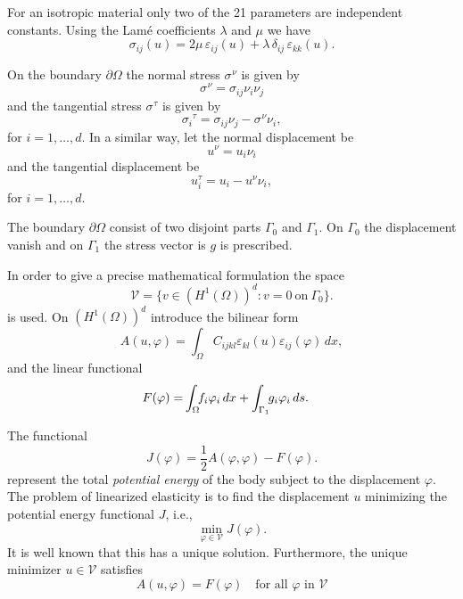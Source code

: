 \documentclass[12pt,a4paper]{article}
\numberwithin{equation}{section}
\numberwithin{table}{section}
\numberwithin{figure}{section}
\newcommand{\dOmega}{{\partial\Omega}}
\newcommand{\ton}{\ \text{on}\ }
\newcommand{\HenO}{H^1(\Omega)}
\newcommand{\V}{\ensuremath{\mathcal{V}}}
\newcommand{\intO}{\int_\Omega\!\!}
\newcommand{\intG}[1][0]{\int_{\Gamma_{#1}}\!\!}
\renewcommand{\epsilon}{\varepsilon}
\renewcommand{\phi}{\varphi}
\newcommand{\strain}[1][]{\ensuremath{\epsilon_{#1}}}
\newcommand{\epsij}{\strain[ij]}
\newcommand{\epskk}{\strain[kk]}
\newcommand{\epskl}{\strain[kl]}
\newcommand{\stress}[1][]{\ensuremath{\sigma_{#1}}}
\newcommand{\sigij}{\stress[ij]}
\newcommand{\dx}{{\,dx}}
\newcommand{\ds}{{\,ds}}
\begin{document}
For an isotropic material only two of the 21 parameters are independent constants.
Using the Lam\'{e} coefficients $\lambda$ and $\mu$ we have
\begin{equation}
  \label{eq:isotropStressStrain}
  \sigij(u) = 2\mu\, \epsij(u) 
  + \lambda\, \delta_{ij}\, \epskk(u).
\end{equation}

On the boundary $\dOmega$ the normal stress $\stress^\nu$ is given by
\[ \stress^\nu = \sigij \nu_i \nu_j \]
and the tangential stress $\stress^\tau$ is given by
\[ \stress[i]^\tau = \sigij \nu_j - \stress^\nu \nu_i, \]
for $i=1,\ldots,d$.  In a similar way, let the normal displacement be
\[ u^\nu = u_i \nu_i \]
and the tangential displacement be
\[ u^\tau_i = u_i - u^\nu \nu_i, \]
for $i=1,\ldots,d$.

The boundary $\dOmega$ consist of two disjoint parts $\Gamma_0$ and $\Gamma_1$.  On $\Gamma_0$ the displacement vanish and on $\Gamma_1$ the stress vector is $g$ is prescribed.

In order to give a precise mathematical formulation the space
\begin{equation}
\V = \{ v\in (\HenO)^d \colon v = 0 \ton\Gamma_0\}.
\end{equation}
is used.  On $(\HenO)^d$ introduce the bilinear form
\begin{equation}
\label{eq:Aelasticity}
A(u,\phi) = \intO C_{ijkl}\epskl(u)\epsij(\phi)\dx,
\end{equation}
and the linear functional
\begin{align}
\label{eq:Felasticity}
F(\phi) = & \intO f_i\phi_i\dx
        + \intG[1] g_i \phi_i\ds. \notag
\end{align}

The functional
\begin{equation}
        J(\phi) = \frac{1}{2}A(\phi,\phi) - F(\phi).
\end{equation}
represent the total \emph{potential energy} of the body subject to the
displacement $\phi$.  The problem of linearized elasticity is to find
the displacement $u$ minimizing the potential energy functional $J$,
i.e.,
\begin{equation}
  \label{eq:UnconstrainedMin}
  \min_{\phi\in\V} J(\phi).
\end{equation}
It is well known that this has a unique solution. Furthermore, the unique minimizer $u\in\V$ satisfies
\begin{equation}
  A(u, \phi) = F(\phi)\quad\text{for all $\phi$ in $\V$}
\end{equation}
\end{document}
